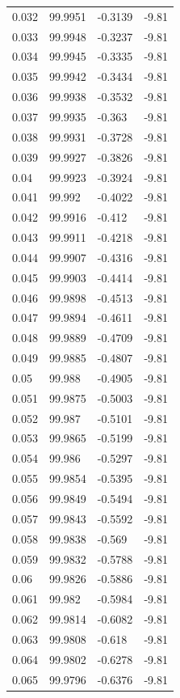 \begin{tabular}{llll}
0.032 & 99.9951 & -0.3139 & -9.81 \\
0.033 & 99.9948 & -0.3237 & -9.81 \\
0.034 & 99.9945 & -0.3335 & -9.81 \\
0.035 & 99.9942 & -0.3434 & -9.81 \\
0.036 & 99.9938 & -0.3532 & -9.81 \\
0.037 & 99.9935 & -0.363 & -9.81 \\
0.038 & 99.9931 & -0.3728 & -9.81 \\
0.039 & 99.9927 & -0.3826 & -9.81 \\
0.04 & 99.9923 & -0.3924 & -9.81 \\
0.041 & 99.992 & -0.4022 & -9.81 \\
0.042 & 99.9916 & -0.412 & -9.81 \\
0.043 & 99.9911 & -0.4218 & -9.81 \\
0.044 & 99.9907 & -0.4316 & -9.81 \\
0.045 & 99.9903 & -0.4414 & -9.81 \\
0.046 & 99.9898 & -0.4513 & -9.81 \\
0.047 & 99.9894 & -0.4611 & -9.81 \\
0.048 & 99.9889 & -0.4709 & -9.81 \\
0.049 & 99.9885 & -0.4807 & -9.81 \\
0.05 & 99.988 & -0.4905 & -9.81 \\
0.051 & 99.9875 & -0.5003 & -9.81 \\
0.052 & 99.987 & -0.5101 & -9.81 \\
0.053 & 99.9865 & -0.5199 & -9.81 \\
0.054 & 99.986 & -0.5297 & -9.81 \\
0.055 & 99.9854 & -0.5395 & -9.81 \\
0.056 & 99.9849 & -0.5494 & -9.81 \\
0.057 & 99.9843 & -0.5592 & -9.81 \\
0.058 & 99.9838 & -0.569 & -9.81 \\
0.059 & 99.9832 & -0.5788 & -9.81 \\
0.06 & 99.9826 & -0.5886 & -9.81 \\
0.061 & 99.982 & -0.5984 & -9.81 \\
0.062 & 99.9814 & -0.6082 & -9.81 \\
0.063 & 99.9808 & -0.618 & -9.81 \\
0.064 & 99.9802 & -0.6278 & -9.81 \\
0.065 & 99.9796 & -0.6376 & -9.81 \\

\end{tabular}

